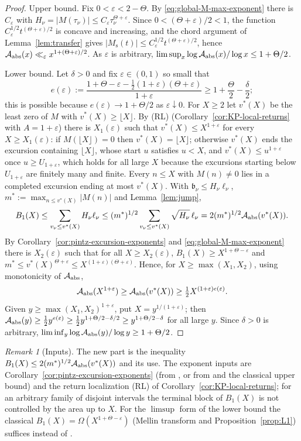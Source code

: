 \documentclass[11pt]{amsart}
\numberwithin{equation}{section}
\theoremstyle{plain}
\theoremstyle{definition}
\theoremstyle{remark}
\newtheorem{remark}[theorem]{Remark}
\newcommand{\Ms}{M_{\mathrm{s}}}
\newcommand{\eps}{\varepsilon}
\begin{document}
\begin{proof}
Upper bound. Fix $0<\eps<2-\Theta$. By \eqref{eq:global-M-max-exponent}
there is $C_\eps$ with $H_\nu=|M(\tau_\nu)|\le C_\eps\tau_\nu^{\Theta+\eps}$.
Since $0<(\Theta+\eps)/2<1$, the function $C_\eps^{1/2}t^{(\Theta+\eps)/2}$ is
concave and increasing, and the chord argument of Lemma~\ref{lem:transfer}
gives $|\Ms(t)|\le C_\eps^{1/2}t^{(\Theta+\eps)/2}$, hence
$\mathcal A_{\rm abs}(x)\ll_\eps x^{1+(\Theta+\eps)/2}$. As $\eps$ is
arbitrary, $\limsup_x\log\mathcal A_{\rm abs}(x)/\log x\le1+\Theta/2$.

Lower bound. Let $\delta>0$ and fix $\eps\in(0,1)$ so small that
\[
e(\eps):=\frac{1+\Theta-\eps-\frac12(1+\eps)(\Theta+\eps)}{1+\eps}
\ge1+\frac\Theta2-\frac\delta2 ;
\]
this is possible because $e(\eps)\to1+\Theta/2$ as $\eps\downarrow0$. For
$X\ge2$ let $v^*(X)$ be the least zero of $M$ with $v^*(X)\ge\lfloor X\rfloor$.
By (RL) (Corollary~\ref{cor:KP-local-returns} with $A=1+\eps$) there is
$X_1(\eps)$ such that $v^*(X)\le X^{1+\eps}$ for every $X\ge X_1(\eps)$: if
$M(\lfloor X\rfloor)=0$ then $v^*(X)=\lfloor X\rfloor$; otherwise $v^*(X)$
ends the excursion containing $\lfloor X\rfloor$, whose start $u$ satisfies
$u<X$, and $v^*(X)\le u^{1+\eps}$ once $u\ge U_{1+\eps}$, which holds for all
large $X$ because the excursions starting below $U_{1+\eps}$ are finitely many
and finite. Every $n\le X$ with $M(n)\ne0$ lies in a completed excursion
ending at most $v^*(X)$. With $\mathfrak b_\nu\le H_\nu\ell_\nu$,
$m^*:=\max_{n\le v^*(X)}|M(n)|$ and Lemma~\ref{lem:jump},
\[
B_1(X)\le\sum_{v_\nu\le v^*(X)}H_\nu\ell_\nu
\le(m^*)^{1/2}\sum_{v_\nu\le v^*(X)}\sqrt{H_\nu}\,\ell_\nu
=2(m^*)^{1/2}\mathcal A_{\rm abs}(v^*(X)).
\]
By Corollary~\ref{cor:pintz-excursion-exponents} and
\eqref{eq:global-M-max-exponent} there is $X_2(\eps)$ such that for all
$X\ge X_2(\eps)$, $B_1(X)\ge X^{1+\Theta-\eps}$ and
$m^*\le v^*(X)^{\Theta+\eps}\le X^{(1+\eps)(\Theta+\eps)}$. Hence, for
$X\ge\max(X_1,X_2)$, using monotonicity of $\mathcal A_{\rm abs}$,
\[
\mathcal A_{\rm abs}(X^{1+\eps})\ge\mathcal A_{\rm abs}(v^*(X))
\ge\tfrac12X^{(1+\eps)e(\eps)} .
\]
Given $y\ge\max(X_1,X_2)^{1+\eps}$, put $X=y^{1/(1+\eps)}$; then
$\mathcal A_{\rm abs}(y)\ge\frac12y^{e(\eps)}\ge\frac12y^{1+\Theta/2-\delta/2}
\ge y^{1+\Theta/2-\delta}$ for all large $y$. Since $\delta>0$ is arbitrary,
$\liminf_y\log\mathcal A_{\rm abs}(y)/\log y\ge1+\Theta/2$.
\end{proof}

\begin{remark}[Inputs]
The new part is the inequality $B_1(X)\le2(m^*)^{1/2}\mathcal A_{\rm abs}(v^*(X))$
and its use. The exponent inputs are Corollary~\ref{cor:pintz-excursion-exponents}
(from \cite{Pintz2026}, or from \cite{Pintz1983} and the classical upper bound)
and the return localization (RL) of Corollary~\ref{cor:KP-local-returns}; for an arbitrary family of disjoint
intervals the terminal block of $B_1(X)$ is not controlled by the area up to
$X$. For the $\limsup$ form of the lower bound the classical
$B_1(X)=\Omega(X^{1+\Theta-\eps})$ (Mellin transform and
Proposition~\ref{prop:L1}) suffices instead of \cite{Pintz2026}.
\end{remark}
\end{document}
